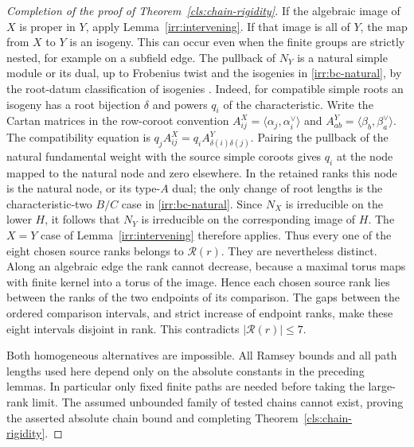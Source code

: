 \begin{proof}[Completion of the proof of Theorem~\ref{cls:chain-rigidity}]
If the algebraic image of $X$ is proper in $Y$, apply
Lemma~\ref{irr:intervening}.  If that image is all of $Y$, the map from
$X$ to $Y$ is an isogeny.  This can occur even when the finite groups are
strictly nested, for example on a subfield edge.  The pullback of $N_Y$
is a natural simple module or its dual, up to Frobenius twist and the
isogenies in \eqref{irr:bc-natural}, by the root-datum classification
of isogenies
\cite[Definition~6.1.8, Example~6.1.9 and Theorem~6.1.16(1)]{Conrad2014}.
Indeed, for compatible simple roots an isogeny has a root bijection
$\delta$ and powers $q_i$ of the characteristic.  Write the Cartan
matrices in the row-coroot convention
$A^X_{ij}=\langle\alpha_j,\alpha_i^\vee\rangle$ and
$A^Y_{ab}=\langle\beta_b,\beta_a^\vee\rangle$.
The compatibility equation is
$q_j A^X_{ij}=q_i A^Y_{\delta(i)\delta(j)}$.
Pairing the pullback of the natural fundamental weight with the source
simple coroots gives $q_i$ at the node mapped to the natural node and
zero elsewhere.  In the retained ranks this node is the natural node,
or its type-$A$ dual; the only change of root lengths is the
characteristic-two $B/C$ case in \eqref{irr:bc-natural}.
Since $N_X$ is irreducible on the
lower $H$, it follows that $N_Y$ is irreducible on the corresponding
image of $H$.  The $X=Y$ case of Lemma~\ref{irr:intervening} therefore
applies.  Thus every one of the eight chosen source ranks belongs to
$\mathcal R(r)$.
They are nevertheless distinct.  Along an algebraic edge the rank cannot
decrease, because a maximal torus maps with finite kernel into a torus
of the image.  Hence each chosen source rank lies between the ranks of
the two endpoints of its comparison.  The gaps between the ordered
comparison intervals, and strict increase of endpoint ranks, make these
eight intervals disjoint in rank.
This contradicts $|\mathcal R(r)|\leq7$.

Both homogeneous alternatives are impossible.  All Ramsey bounds and
all path lengths used here depend only on the absolute constants in the
preceding lemmas.  In particular only fixed finite paths are needed
before taking the large-rank limit.  The assumed unbounded family of
tested chains cannot exist, proving the asserted absolute chain bound
and completing Theorem~\ref{cls:chain-rigidity}.
\end{proof}
